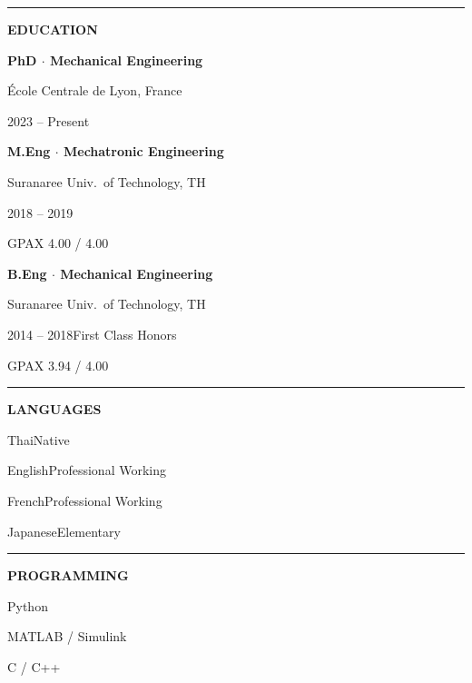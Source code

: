 \documentclass[a4paper,10pt]{article}
\newlength{\sbC}\setlength{\sbC}{54mm}
\newcommand{\sideheading}[1]{%
  \vspace{5pt}%
  {\color{sideborder}\rule{\sbC}{0.3pt}}\par\vspace{2pt}%
  {\color{accentlight}\fontsize{6}{8}\selectfont\bfseries\MakeUppercase{#1}}\par\vspace{4pt}%
}
\begin{document}
{{\begin{minipage}{\sbC}
    \sideheading{Education}
    {\fontsize{7}{9}\selectfont
      \color{sidetext}\bfseries PhD $\cdot$ Mechanical Engineering\normalfont\par
      \color{sidegray}\'Ecole Centrale de Lyon, France\par
      \color{accentlight}2023 -- Present\par\vspace{2pt}
      \color{sidetext}\bfseries M.Eng $\cdot$ Mechatronic Engineering\normalfont\par
      \color{sidegray}Suranaree Univ.\ of Technology, TH\par
      \color{accentlight}2018 -- 2019\par\vspace{2pt}
      \par
      \color{sidegray}GPAX 4.00 / 4.00%
      \par\vspace{2pt}
      \color{sidetext}\bfseries B.Eng $\cdot$ Mechanical Engineering\normalfont\par
      \color{sidegray}Suranaree Univ.\ of Technology, TH\par
      \color{accentlight}2014 -- 2018\enspace\color{sidegray}First Class Honors\par
      \color{sidegray}GPAX 3.94 / 4.00%
    }

    \sideheading{Languages}
    {\fontsize{7}{9}\selectfont
      \color{sidetext}Thai\hfill\color{accentlight}Native\par\vspace{1.5pt}
      \color{sidetext}English\hfill\color{accentlight}Professional Working\par\vspace{1.5pt}
      \color{sidetext}French\hfill\color{accentlight}Professional Working\par\vspace{1.5pt}
      \color{sidetext}Japanese\hfill\color{accentlight}Elementary\par\vspace{1.5pt}
    }

    \sideheading{Programming}
    {\fontsize{7}{9}\selectfont
      \color{sidetext}Python\par\vspace{1.5pt}
      \color{sidetext}MATLAB / Simulink\par\vspace{1.5pt}
      \color{sidetext}C / C++\par\vspace{1.5pt}
    }


\end{minipage}}}
\end{document}
